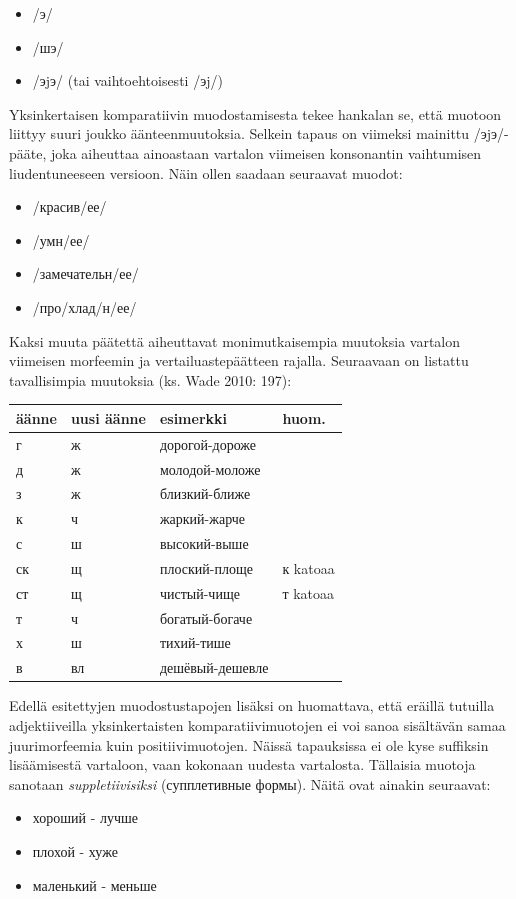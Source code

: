 \documentclass[]{scrreprt}
\providecommand{\tightlist}{%
  \setlength{\itemsep}{0pt}\setlength{\parskip}{0pt}}
\begin{document}
\begin{itemize}
\tightlist
\item
  /э/
\item
  /шэ/
\item
  /эjэ/ (tai vaihtoehtoisesti /эj/)
\end{itemize}

Yksinkertaisen komparatiivin muodostamisesta tekee hankalan se, että
muotoon liittyy suuri joukko äänteenmuutoksia. Selkein tapaus on
viimeksi mainittu /эjэ/-pääte, joka aiheuttaa ainoastaan vartalon
viimeisen konsonantin vaihtumisen liudentuneeseen versioon. Näin ollen
saadaan seuraavat muodot:

\begin{itemize}
\tightlist
\item
  /красив/ее/
\item
  /умн/ее/
\item
  /замечательн/ее/
\item
  /про/хлад/н/ее/
\end{itemize}

Kaksi muuta päätettä aiheuttavat monimutkaisempia muutoksia vartalon
viimeisen morfeemin ja vertailuastepäätteen rajalla. Seuraavaan on
listattu tavallisimpia muutoksia (ks. Wade 2010: 197):

\begin{longtable}[c]{@{}llll@{}}
\toprule
äänne & uusi äänne & esimerkki & huom.\tabularnewline
\midrule
\endhead
г & ж & дорогой-дороже &\tabularnewline
д & ж & молодой-моложе &\tabularnewline
з & ж & близкий-ближе &\tabularnewline
к & ч & жаркий-жарче &\tabularnewline
с & ш & высокий-выше &\tabularnewline
ск & щ & плоский-площе & к katoaa\tabularnewline
ст & щ & чистый-чище & т katoaa\tabularnewline
т & ч & богатый-богаче &\tabularnewline
х & ш & тихий-тише &\tabularnewline
в & вл & дешёвый-дешевле &\tabularnewline
\bottomrule
\end{longtable}

Edellä esitettyjen muodostustapojen lisäksi on huomattava, että eräillä
tutuilla adjektiiveilla yksinkertaisten komparatiivimuotojen ei voi
sanoa sisältävän samaa juurimorfeemia kuin positiivimuotojen. Näissä
tapauksissa ei ole kyse suffiksin lisäämisestä vartaloon, vaan kokonaan
uudesta vartalosta. Tällaisia muotoja sanotaan \emph{suppletiivisiksi}
(супплетивные формы). Näitä ovat ainakin seuraavat:

\begin{itemize}
\tightlist
\item
  хороший - лучше
\item
  плохой - хуже
\item
  маленький - меньше
\end{itemize}
\end{document}
